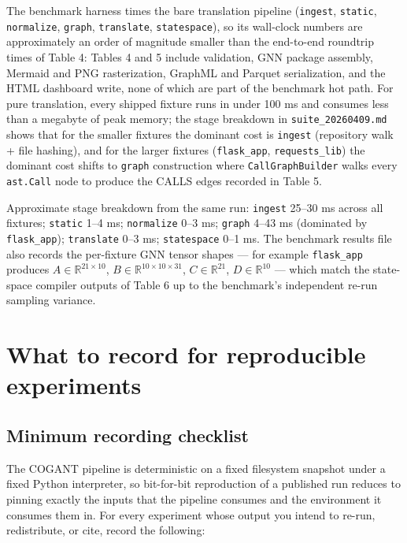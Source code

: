 \documentclass[
]{article}
\newcounter{none} %
\begin{document}
The benchmark harness times the bare translation pipeline
(\texttt{ingest}, \texttt{static}, \texttt{normalize}, \texttt{graph},
\texttt{translate}, \texttt{statespace}), so its wall-clock numbers are
approximately an order of magnitude smaller than the end-to-end
roundtrip times of Table 4: Tables 4 and 5 include validation, GNN
package assembly, Mermaid and PNG rasterization, GraphML and Parquet
serialization, and the HTML dashboard write, none of which are part of
the benchmark hot path. For pure translation, every shipped fixture runs
in under 100 ms and consumes less than a megabyte of peak memory; the
stage breakdown in \texttt{suite\_20260409.md} shows that for the
smaller fixtures the dominant cost is \texttt{ingest} (repository walk +
file hashing), and for the larger fixtures (\texttt{flask\_app},
\texttt{requests\_lib}) the dominant cost shifts to \texttt{graph}
construction where \texttt{CallGraphBuilder} walks every
\texttt{ast.Call} node to produce the CALLS edges recorded in Table 5.

Approximate stage breakdown from the same run: \texttt{ingest} 25--30 ms
across all fixtures; \texttt{static} 1--4 ms; \texttt{normalize} 0--3
ms; \texttt{graph} 4--43 ms (dominated by \texttt{flask\_app});
\texttt{translate} 0--3 ms; \texttt{statespace} 0--1 ms. The benchmark
results file also records the per-fixture GNN tensor shapes --- for
example \texttt{flask\_app} produces
\(A \in \mathbb{R}^{21 \times 10}\),
\(B \in \mathbb{R}^{10 \times 10 \times 31}\),
\(C \in \mathbb{R}^{21}\), \(D \in \mathbb{R}^{10}\) --- which match the
state-space compiler outputs of Table 6 up to the benchmark's
independent re-run sampling variance.

\newpage

\section{What to record for reproducible
experiments}\label{what-to-record-for-reproducible-experiments}

\subsection{Minimum recording
checklist}\label{minimum-recording-checklist}

The COGANT pipeline is deterministic on a fixed filesystem snapshot
under a fixed Python interpreter, so bit-for-bit reproduction of a
published run reduces to pinning exactly the inputs that the pipeline
consumes and the environment it consumes them in. For every experiment
whose output you intend to re-run, redistribute, or cite, record the
following:
\end{document}
